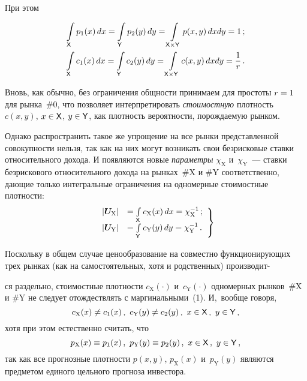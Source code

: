 \begin{multicols}{2}
     \vspace*{-2pt}
  
 \noindent
  При этом
  
  \noindent
  \begin{align*}
  \int\limits_{\sf X} p_1(x)\,dx=\int\limits_{\sf Y} p_2(y)\,dy=\int\limits_{{\sf 
X}\times{\sf Y}} p(x,y)\,dxdy=1\,;\\
  \int\limits_{\sf X} c_1(x)\,dx=\int\limits_{\sf Y} c_2(y)\,dy=\int\limits_{{\sf 
X}\times{\sf Y}} c(x,y)\,dxdy=\displaystyle\frac{\displaystyle 1\mathstrut}{\displaystyle r\mathstrut}\,.
  \end{align*}
  
  Вновь, как обычно, без ограничения общности принимаем для простоты 
$r\hm = 1$ для рынка~\#0, что позволяет интерпретировать 
\textit{стоимостную} плотность $c(x, y)$, $x \hm\in{\sf X}$, $y \hm\in{\sf  Y}$, 
как плотность вероятности, порождаемую рынком. 
  
  Однако распространить такое же упрощение на все рынки представленной 
совокупности нельзя, так как на них могут возникать свои безрисковые ставки 
относительного дохода. И появляются новые \textit{параметры} 
$\chi_{\mathrm{X}}$ и~$\chi_{\mathrm{Y}}$~--- ставки безрискового 
относительного дохода на рынках~\#X и \#Y соответственно, дающие только 
интегральные ограничения на одномерные стоимостные плотности: 
  \begin{equation}
  \left.
  \begin{array}{rl}
  \left\vert \boldsymbol{U}_{\mathrm{X}}\right\vert &=\int\limits_{\sf X} 
c_{\mathrm{X}} (x)\,dx=\chi^{-1}_{\mathrm{X}}\,;\\[6pt] 
  \left\vert \boldsymbol{U}_{\mathrm{Y}}\right\vert &=\int\limits_{\sf Y} 
c_{\mathrm{Y}} (y)\,dy=\chi^{-1}_{\mathrm{Y}}\,.
\end{array}
\right\}
  \label{e2-ag}
  \end{equation}
  
  Поскольку в общем случае ценообразование на совместно 
функционирующих трех рынках (как на самостоятельных, хотя и родственных) 
производит-\linebreak\vspace*{-12pt}

\pagebreak

\noindent
ся раздельно, стоимостные плотности $c_{\mathrm{X}}(\cdot)$ 
и~$c_{\mathrm{Y}}(\cdot)$ одномерных рынков~\#X и \#Y не следует 
отождествлять с маргинальными~(1). И,~вообще говоря, 
  $$
  c_{\mathrm{X}}(x)\not= c_1(x)\,,\ c_{\mathrm{Y}}(y)\not= c_2(y)\,,\ x\in {\sf 
X}\,,\ y\in {\sf Y}\,,
  $$
  хотя при этом естественно считать, что 
  $$
  p_{\mathrm{X}}(x)\equiv p_1(x)\,,\ p_{\mathrm{Y}}(y)\equiv p_2(y)\,,\ x\in{\sf 
X}\,,\ y\in{\sf Y}\,,
  $$
так как все прогнозные плотности $p(x, y)$, $p_{\mathrm{X}}(x)$ 
и~$p_{\mathrm{Y}}(y)$ являются предметом единого цельного прогноза инвестора. 


\end{multicols}
